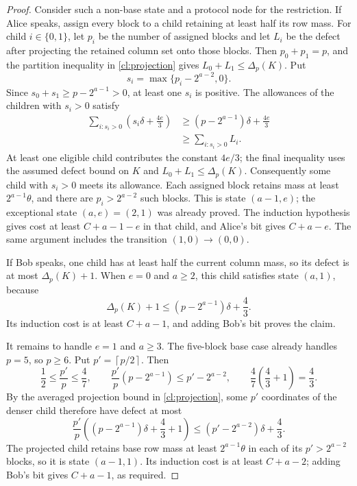 \documentclass[11pt]{article} \usepackage[utf8]{inputenc}
\theoremstyle{plain} \newtheorem{theorem}{Theorem}[section]
\theoremstyle{definition} \newaliascnt{definition}{theorem}
\newcommand{\ceil}[1]{\left\lceil#1\right\rceil}
\begin{document}
\begin{proof}
Consider such a non-base state and a protocol node for the restriction. If Alice
speaks, assign every block to a child retaining at least half its row mass. For
child \(i\in\{0,1\}\), let \(p_i\) be the number of assigned blocks and let
\(L_i\) be the defect after projecting the retained column set onto those
blocks. Then \(p_0+p_1=p\), and the partition inequality in \cref{cl:projection}
gives \(L_0+L_1\le\Delta_p(K)\). Put
\[
s_i=\max\{p_i-2^{a-2},0\}.
\]
Since \(s_0+s_1\ge p-2^{a-1}>0\), at least one \(s_i\) is positive. The
allowances of the children with \(s_i>0\) satisfy
\[
 \begin{aligned}
\sum_{i:s_i>0}\left(s_i\delta+\frac{4e}{3}\right)
 &\ge (p-2^{a-1})\delta+\frac{4e}{3}\\
&\ge\sum_{i:s_i>0}L_i.
 \end{aligned}
\]
At least one eligible child contributes the constant \(4e/3\); the
final inequality uses the assumed defect bound on \(K\) and
\(L_0+L_1\le\Delta_p(K)\). Consequently some child with \(s_i>0\) meets its
allowance. Each assigned block retains mass at least \(2^{a-1}\theta\), and
there are \(p_i>2^{a-2}\) such blocks. This is state \((a-1,e)\); the exceptional
state \((a,e)=(2,1)\) was already proved. The induction hypothesis gives cost at least
\(C+a-1-e\) in that child, and Alice's bit gives \(C+a-e\). The same argument
includes the transition \((1,0)\to(0,0)\).

If Bob speaks, one child has at least half the current column mass, so its defect
is at most \(\Delta_p(K)+1\). When \(e=0\) and \(a\ge2\), this child satisfies
state \((a,1)\), because
\[
\Delta_p(K)+1\le(p-2^{a-1})\delta+\frac43.
\]
Its induction cost is at least \(C+a-1\), and adding Bob's bit proves the claim.

It remains to handle \(e=1\) and \(a\ge3\). The five-block base case already
handles \(p=5\), so \(p\ge6\). Put \(p'=\ceil{p/2}\). Then
\[
\frac12\le\frac{p'}p\le\frac47,\qquad
\frac{p'}p(p-2^{a-1})\le p'-2^{a-2},\qquad
\frac47\left(\frac43+1\right)=\frac43.
\]
By the averaged projection bound in \cref{cl:projection}, some \(p'\)
coordinates of the denser child therefore have defect at most
\[
\frac{p'}p\left((p-2^{a-1})\delta+\frac43+1\right)
\le(p'-2^{a-2})\delta+\frac43.
\]
The projected child retains base row mass at least \(2^{a-1}\theta\) in each
of its \(p'>2^{a-2}\) blocks, so it is state \((a-1,1)\). Its induction cost is at
least \(C+a-2\); adding Bob's bit gives \(C+a-1\), as required.
\end{proof}
\end{document}
